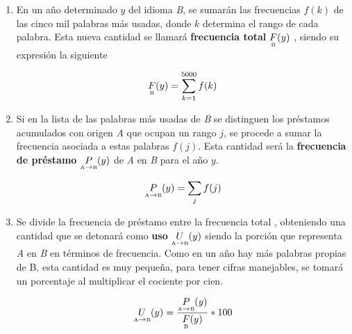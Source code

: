 \begin{enumerate}
	
	\item En un año determinado $y$ del idioma \textit{B}, se sumarán las
	frecuencias $f(k)$ de las cinco mil palabras más usadas, donde $k$ determina el rango  de cada palabra. Esta nueva cantidad se llamará \textbf{frecuencia total}  $\underset{\text{\tiny B}}{F}(y)$ , siendo su expresión la siguiente

	\begin{equation}
	\label{ec.ftot}
	\underset{\text{\tiny B}}{F}(y) = \sum_{k=1}^{5000} f(k)
	\end{equation}
	


	\item Si en la lista de las palabras más usadas de \textit{B} se distinguen los préstamos acumulados con origen \textit{A} que ocupan un rango $j$,  se procede a sumar la frecuencia asociada a estas palabras $f(j)$. Esta cantidad será la  \textbf{frecuencia de préstamo} $\underset{ \text{\tiny A} \to  \text{\tiny B} }{P}(y)$   de \textit{A} en \textit{B} para el año $y$.
	
	\begin{equation}
	\label{ec.fpres}
	\underset{ \text{\tiny A} \to  \text{\tiny B} }{P}(y) = \sum_{j} f(j)
	\end{equation}
	
	
	\item   Se divide la frecuencia de préstamo entre la frecuencia total , obteniendo una cantidad que se detonará como  \textbf{uso} $\underset{ \text{\tiny A} \to  \text{\tiny B} }{U}(y)$  siendo la porción que representa \textit{A} en \textit{B} en términos de frecuencia.  Como en un año hay más palabras propias de B, esta cantidad es muy pequeña, para tener cifras manejables, se tomará un porcentaje al multiplicar el cociente por cien.  

	\begin{equation}
	\label{ec.fuso}
	 \underset{ \text{\tiny A} \to  \text{\tiny B} }{U}(y) = \frac{	\underset{ \text{\tiny A} \to  \text{\tiny B} }{P}(y)}{\underset{\text{\tiny B}}{F}(y) } * 100
	\end{equation}
	

\end{enumerate}
